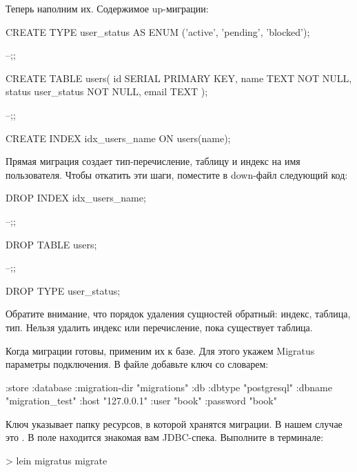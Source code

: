 Теперь наполним их. Содержимое up-миграции:

\begin{english}
  \begin{sql}
CREATE TYPE user_status AS ENUM
       ('active', 'pending', 'blocked');

--;;

CREATE TABLE users(
  id SERIAL PRIMARY KEY,
  name TEXT NOT NULL,
  status user_status NOT NULL,
  email TEXT
);

--;;

CREATE INDEX idx_users_name ON users(name);
  \end{sql}
\end{english}

Прямая миграция создает тип-перечисление, таблицу  и индекс на имя пользователя. Чтобы откатить эти шаги, поместите в down-файл следующий код:

\begin{english}
  \begin{sql}
DROP INDEX idx_users_name;

--;;

DROP TABLE users;

--;;

DROP TYPE user_status;
  \end{sql}
\end{english}

Обратите внимание, что порядок удаления сущностей обратный: индекс, таблица, тип. Нельзя удалить индекс или перечисление, пока существует таблица.

Когда миграции готовы, применим их к базе. Для этого укажем Migratus параметры подключения. В файле  добавьте ключ  со словарем:

\begin{english}
  \begin{clojure}
{:store :database
 :migration-dir "migrations"
 :db {:dbtype "postgresql"
      :dbname "migration_test"
      :host "127.0.0.1"
      :user "book"
      :password "book"}}
  \end{clojure}
\end{english}

Ключ  указывает папку ресурсов, в которой хранятся миграции. В нашем случае это . В поле  находится знакомая вам JDBC-спека. Выполните в терминале:

\begin{english}
  \begin{bash}
> lein migratus migrate
  \end{bash}
\end{english}

